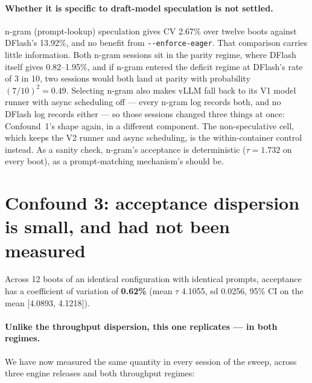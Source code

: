 \documentclass[11pt]{article}
\newcommand{\tw}[1]{\texttt{\small #1}}
\begin{document}
\paragraph{Whether it is specific to draft-model speculation is not
settled.} n-gram (prompt-lookup) speculation gives CV 2.67\% over twelve
boots against DFlash's 13.92\%, and no benefit from \tw{-{}-enforce-eager}.
That comparison carries little information. Both n-gram sessions sit in the
parity regime, where DFlash itself gives 0.82--1.95\%, and if n-gram entered
the deficit regime at DFlash's rate of 3 in 10, two sessions would both land
at parity with probability $(7/10)^2 = 0.49$. Selecting n-gram also makes
vLLM fall back to its V1 model runner with async scheduling off --- every
n-gram log records both, and no DFlash log records either --- so those
sessions changed three things at once: Confound~1's shape again, in a
different component. The non-speculative cell, which keeps the V2 runner
and async scheduling, is the within-container control instead. As a sanity
check, n-gram's acceptance is deterministic ($\tau = 1.732$ on every boot),
as a prompt-matching mechanism's should be.

\section{Confound 3: acceptance dispersion is small, and had not been
measured}\label{sec:c3}

Across 12 boots of an identical configuration with identical prompts,
acceptance has a coefficient of variation of \textbf{0.62\%} (mean $\tau$
4.1055, sd 0.0256, 95\% CI on the mean [4.0893, 4.1218]).

\paragraph{Unlike the throughput dispersion, this one replicates --- in both
regimes.} We have now measured the same quantity in every session of the
sweep, across three engine releases and both throughput regimes:
\end{document}
